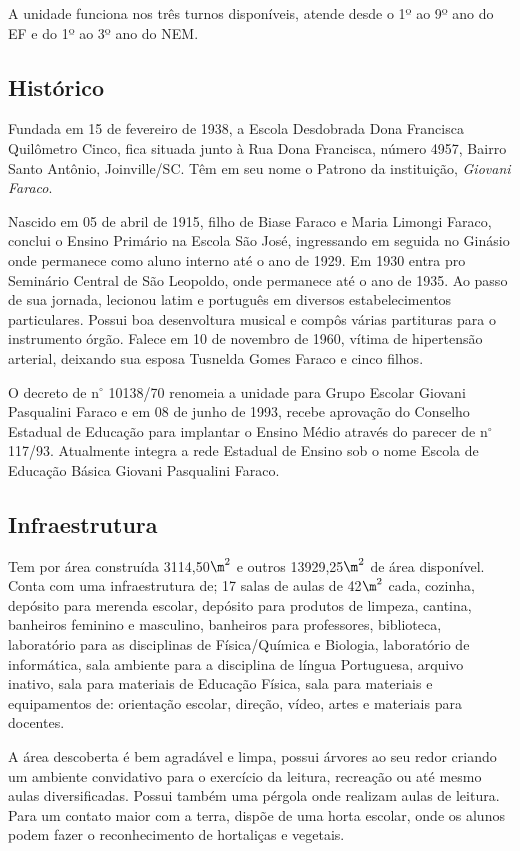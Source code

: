 A unidade funciona nos três turnos disponíveis, atende desde o 1º ao 9º ano do \ac{EF} e do 1º ao 3º ano do \ac{NEM}.

\subsection{Histórico}
Fundada em 15 de fevereiro de 1938, a Escola Desdobrada Dona Francisca Quilômetro Cinco, fica situada junto à Rua Dona Francisca, número 4957, Bairro Santo Antônio, Joinville/SC. Têm em seu nome o Patrono da instituição, \emph{Giovani Faraco}.

Nascido em 05 de abril de 1915, filho de Biase Faraco e Maria Limongi Faraco, conclui o Ensino Primário na Escola São José, ingressando em seguida no Ginásio onde permanece como aluno interno até o ano de 1929. Em 1930 entra pro Seminário Central de São Leopoldo, onde permanece até o ano de 1935. Ao passo de sua jornada, lecionou latim e português em diversos estabelecimentos particulares. Possui boa desenvoltura musical e compôs várias partituras para o instrumento órgão. Falece em 10 de novembro de 1960, vítima de hipertensão arterial, deixando sua esposa Tusnelda Gomes Faraco e cinco filhos.

O decreto de n$^\circ$ 10138/70 renomeia a unidade para Grupo Escolar Giovani Pasqualini Faraco e em 08 de junho de 1993, recebe aprovação do Conselho Estadual de Educação para implantar o Ensino Médio através do parecer de n$^\circ$ 117/93. Atualmente integra a rede Estadual de Ensino sob o nome Escola de Educação Básica Giovani Pasqualini Faraco.

\subsection{Infraestrutura}
Tem por área construída 3114,50$\m^2$ e outros 13929,25$\m^2$ de área disponível. Conta com uma infraestrutura de; 17 salas de aulas  de 42$\m^2$ cada, cozinha, depósito para merenda escolar, depósito para produtos de limpeza, cantina, banheiros feminino e masculino, banheiros para professores, biblioteca, laboratório para as disciplinas de Física/Química e Biologia, laboratório de informática, sala ambiente para a disciplina de língua Portuguesa, arquivo inativo, sala para materiais de Educação Física, sala para materiais e equipamentos de: orientação escolar, direção, vídeo, artes e materiais para docentes.

A área descoberta é bem agradável e limpa, possui árvores ao seu redor criando um ambiente convidativo para o exercício da leitura, recreação ou até mesmo aulas diversificadas. Possui também uma pérgola onde realizam aulas de leitura. Para um contato maior com a terra, dispõe de uma horta escolar, onde os alunos podem fazer o reconhecimento de hortaliças e vegetais.

